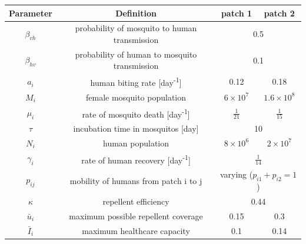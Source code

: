 \documentclass[a1paper,portrait,fontscale=0.45]{baposter}
\begin{document}
\begin{poster}
{\begin{minipage}{.45\linewidth}
    \end{minipage}
    \begin{minipage}{0.55\linewidth}
      \centering
      \begin{tabular}{|c|c|c c|}
        \hline
        Parameter & Definition & patch 1 & patch 2\\
        \hline
        $\beta_{vh}$ & probability of mosquito to human transmission & \multicolumn{2}{c|}{0.5}\\
        $\beta_{hv}$ & probability of human to mosquito transmission & \multicolumn{2}{c|}{0.1}\\
        $a_i$ & human biting rate [day\textsuperscript{-1}] & 0.12 & 0.18 \\
        $M_i$ & female mosquito population & $6 \times 10^7$ & $1.6 \times 10^8$ \\
        $\mu_i$ & rate of mosquito death [day\textsuperscript{-1}] & $\frac{1}{21}$ & $\frac{1}{15}$ \\
        $\tau$ & incubation time in mosquitos [day] & \multicolumn{2}{c|}{10} \\
        $N_i$ & human population & $8 \times 10^6$ & $2 \times 10^7$\\
        $\gamma_i$ & rate of human recovery [day\textsuperscript{-1}] & \multicolumn{2}{c|}{$\frac{1}{14}$}\\
        $p_{ij}$ & mobility of humans from patch i to j & \multicolumn{2}{c|}{varying ($p_{i1}+p_{i2}=1$)}\\
        $\kappa$ & repellent efficiency & \multicolumn{2}{c|}{0.44}\\
        $\bar{u}_i$ & maximum possible repellent coverage & 0.15 & 0.3\\
        $\bar{I}_i$ & maximum healthcare capacity & 0.1 & 0.14\\
        \hline
      \end{tabular}
    \end{minipage}

  }


\end{poster}
\end{document}
